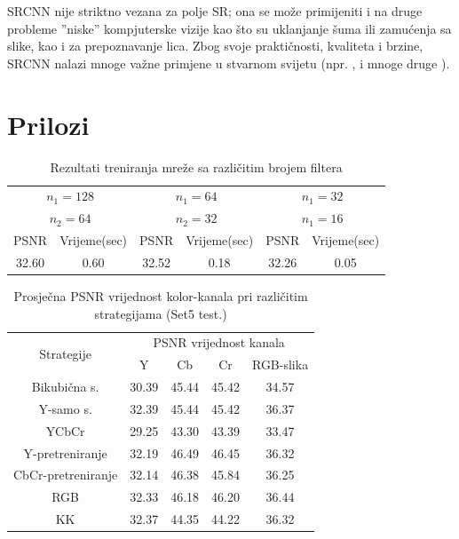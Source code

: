 \documentclass[12pt]{report}
\numberwithin{equation}{section}
\begin{document}
  SRCNN nije striktno vezana za polje SR; ona se može primijeniti i na druge probleme ''niske'' kompjuterske vizije kao što su uklanjanje šuma ili zamućenja sa slike, kao i za prepoznavanje lica. Zbog svoje praktičnosti, kvaliteta i brzine, SRCNN nalazi mnoge važne primjene u stvarnom svijetu (npr. \cite{primjena}, i mnoge druge \cite{files}).
     
   

\chapter{Prilozi}



\begin{table}[h!]
\centering
\begin{tabular}{ |c|c|c|c|c|c| } 
\hline
\multicolumn{2}{|c|}{$n_1=128$} & \multicolumn{2}{|c|}{$n_1=64$} & \multicolumn{2}{|c|}{$n_1=32$} \\
\multicolumn{2}{|c|}{$n_2=64$} & \multicolumn{2}{|c|}{$n_2=32$} & \multicolumn{2}{|c|}{$n_1=16$} \\
\hline
PSNR & Vrijeme(sec) & PSNR & Vrijeme(sec) & PSNR & Vrijeme(sec) \\
\hline
32.60 & 0.60 & 32.52 & 0.18 & 32.26 & 0.05 \\
\hline
\end{tabular}
\caption{Rezultati treniranja mreže sa različitim brojem filtera}
\label{table:1}
\end{table}



\begin{table}[h!]
\centering
\begin{tabular}{ |c|c|c|c|c| } 
\hline
\multirow{2}{*}{Strategije}&\multicolumn{4}{|c|}{PSNR vrijednost kanala}\\
\cline{2-5}
&Y & Cb & Cr & RGB-slika\\ 
\hline
Bikubična s. & 30.39 & 45.44 & 45.42 & 34.57 \\
Y-samo s. & 32.39 & 45.44 & 45.42 & 36.37 \\
YCbCr & 29.25 & 43.30 & 43.39 & 33.47 \\
Y-pretreniranje & 32.19 & 46.49 & 46.45 & 36.32 \\
CbCr-pretreniranje & 32.14 & 46.38 & 45.84 & 36.25 \\
RGB & 32.33 & 46.18 & 46.20 & 36.44 \\
KK & 32.37 & 44.35 & 44.22 & 36.32 \\
\hline
\end{tabular}
\caption{Prosječna PSNR vrijednost kolor-kanala pri različitim strategijama (Set5 test.)}
\label{table:2}
\end{table}
\end{document}
